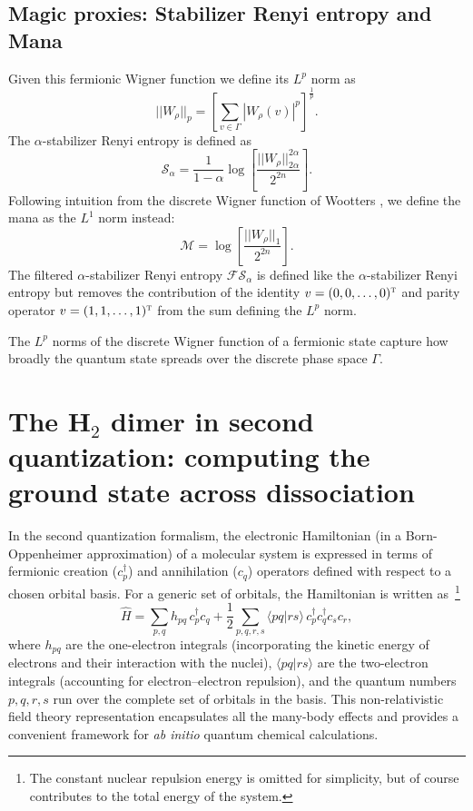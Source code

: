 \documentclass[aps,prl,twocolumn,groupedaddress, reprint,floatfix,nofootinbib,longbibliography]{revtex4-2}
\begin{document}
    \subsection{Magic proxies: Stabilizer Renyi entropy and Mana}

        Given this fermionic Wigner function we define its $L^p$ norm as
        \begin{equation}
            || W_\rho ||_p = \left[\sum_{v\in\Gamma} | W_\rho(v) |^p\right]^{\frac{1}{p}}.
        \end{equation}
        The $\alpha$-stabilizer Renyi entropy is defined as
        \begin{equation}
            \mathcal S_\alpha = \frac{1}{1-\alpha}\log\left[\frac{|| W_\rho ||_{2\alpha}^{2\alpha}}{2^{2n}}\right].
        \end{equation}
        Following intuition from the discrete Wigner function of Wootters \cite{wootters1987wigner, gibbons2004discrete}, we define the mana as the $L^1$ norm instead:
        \begin{equation}
            \mathcal M = \log\left[\frac{|| W_\rho ||_{1}}{2^{2n}}\right].
        \end{equation}
        The filtered $\alpha$-stabilizer Renyi entropy $\mathcal{FS}_\alpha$ is defined like the $\alpha$-stabilizer Renyi entropy but removes the contribution of the identity $v = (0, 0, \dots, 0)^\textsc{t}$ and parity operator $v = (1, 1, \dots, 1)^\textsc{t}$ from the sum defining the $L^{p}$ norm.

        The $L^p$ norms of the discrete Wigner function of a fermionic state capture how broadly the quantum state spreads over the discrete phase space $\Gamma$.


\section{The H$_2$ dimer in second quantization: computing the ground state across dissociation}

    In the second quantization formalism, the electronic Hamiltonian (in a Born-Oppenheimer approximation) of a molecular system is expressed in terms of fermionic creation (\(c_p^\dagger\)) and annihilation (\(c_q\)) operators defined with respect to a chosen orbital basis. For a generic set of orbitals, the Hamiltonian is written as~\footnote{The constant nuclear repulsion energy is omitted for simplicity, but of course contributes to the total energy of the system.}
    \begin{equation}
    \hat{H} = \sum_{p,q} h_{pq}\, c_p^\dagger c_q + \frac{1}{2} \sum_{p,q,r,s} \langle pq \vert rs \rangle\, c_p^\dagger c_q^\dagger c_s c_r,
    \end{equation}
    where $h_{pq}$ are the one-electron integrals (incorporating the kinetic energy of electrons and their interaction with the nuclei), $\langle pq \vert rs \rangle$ are the two-electron integrals (accounting for electron--electron repulsion), and the quantum numbers $p, q, r, s$ run over the complete set of orbitals in the basis. This non-relativistic field theory representation encapsulates all the many-body effects and provides a convenient framework for \textit{ab initio} quantum chemical calculations.
\end{document}
